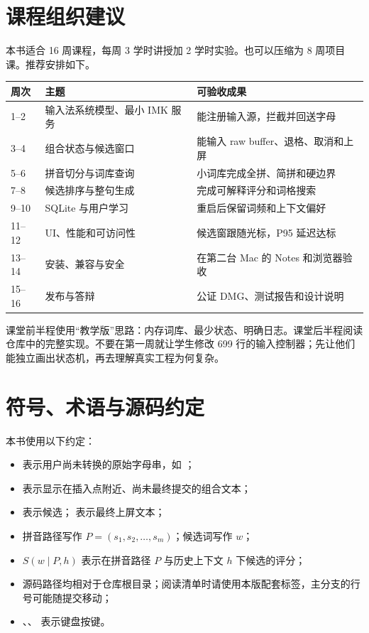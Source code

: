 \chapter*{课程组织建议}

本书适合 16 周课程，每周 3 学时讲授加 2 学时实验。也可以压缩为 8 周项目课。推荐安排如下。

\begin{longtable}{p{1.2cm}p{4cm}p{6.3cm}}
\toprule
周次 & 主题 & 可验收成果 \\
\midrule
1--2 & 输入法系统模型、最小 IMK 服务 & 能注册输入源，拦截并回送字母 \\
3--4 & 组合状态与候选窗口 & 能输入 raw buffer、退格、取消和上屏 \\
5--6 & 拼音切分与词库查询 & 小词库完成全拼、简拼和硬边界 \\
7--8 & 候选排序与整句生成 & 完成可解释评分和词格搜索 \\
9--10 & SQLite 与用户学习 & 重启后保留词频和上下文偏好 \\
11--12 & UI、性能和可访问性 & 候选窗跟随光标，P95 延迟达标 \\
13--14 & 安装、兼容与安全 & 在第二台 Mac 的 Notes 和浏览器验收 \\
15--16 & 发布与答辩 & 公证 DMG、测试报告和设计说明 \\
\bottomrule
\end{longtable}

\begin{concept}[两条代码路线]
课堂前半程使用“教学版”思路：内存词库、最少状态、明确日志。课堂后半程阅读仓库中的完整实现。不要在第一周就让学生修改 699 行的输入控制器；先让他们能独立画出状态机，再去理解真实工程为何复杂。
\end{concept}

\chapter*{符号、术语与源码约定}

本书使用以下约定：

\begin{itemize}
  \item {} 表示用户尚未转换的原始字母串，如 ；
  \item {} 表示显示在插入点附近、尚未最终提交的组合文本；
  \item {} 表示候选； 表示最终上屏文本；
  \item 拼音路径写作 \(P=(s_1,s_2,\ldots,s_m)\)；候选词写作 \(w\)；
  \item \(S(w\mid P,h)\) 表示在拼音路径 \(P\) 与历史上下文 \(h\) 下候选的评分；
  \item 源码路径均相对于仓库根目录；阅读清单时请使用本版配套标签，主分支的行号可能随提交移动；
  \item {}、、 表示键盘按键。
\end{itemize}

